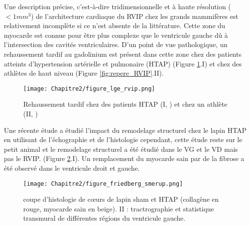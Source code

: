 Une description précise, c’est-à-dire tridimensionnelle et à haute résolution ($<1 mm^3$) de l’architecture cardiaque du RVIP chez les grands mammifères est relativement incomplète si ce n’est absente de la littérature. Cette zone du myocarde est connue pour être plus complexe que le ventricule gauche dû à l’intersection des cavités ventriculaires. D’un point de vue pathologique, un rehaussement tardif au gadolinium est présent dans cette zone chez des patients atteints d’hypertension artérielle et pulmonaire (HTAP) (Figure \ref{fig:gado_RVIP}.I) \cite{Swift2014} et chez des athlètes de haut niveau \cite{DomenechXimenos2020} (Figure \ref{fig:repere_RVIP}.II).
\\
\begin{figure}[!ht]
  \begin{center}
    \texttt{[image: Chapitre2/figure\_lge\_rvip.png]}
  \end{center}
  \caption{Rehaussement tardif chez des patients HTAP (I, \cite{Swift2014}) et chez un athlète (II, \cite{DomenechXimenos2020})}
  \label{fig:gado_RVIP}
\end{figure}

Une récente étude \cite{Friedberg2013} a étudié l’impact du remodelage structurel chez le lapin HTAP en utilisant de l’échographie et de l’histologie cependant,  cette étude reste sur le petit animal et le remodelage structurel a été étudié dans le VG et le VD mais pas le RVIP. (Figure \ref{fig:histo_smerup}.I). Un remplacement du myocarde sain par de la fibrose a été observé dans le ventricule droit et gauche.

\begin{figure}[!ht]
  \begin{center}
    \texttt{[image: Chapitre2/figure\_friedberg\_smerup.png]}
  \end{center}
  \caption{coupe d’histologie de cœurs de lapin sham et HTAP \cite{Friedberg2013} (collagène en rouge, myocarde sain en beige). II : tractrographie et statistique transmural de différentes régions du ventricule gauche.\cite{Smerup2008}}
  \label{fig:histo_smerup}
\end{figure}


